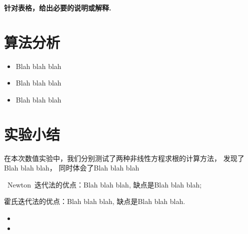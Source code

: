 \documentclass[UTF8]{ctexart}
\begin{document}
{\bf 针对表格，给出必要的说明或解释.}

\section{算法分析}
\begin{itemize}
    \item Blah blah blah  
    \item Blah blah blah  
    \item Blah blah blah  
\end{itemize}


%


\section{实验小结}
在本次数值实验中，我们分别测试了两种非线性方程求根的计算方法，
发现了Blah blah blah，
同时体会了Blah blah blah

~Newton~迭代法的优点：Blah blah blah,
缺点是Blah blah blah;

霍氏迭代法的优点：Blah blah blah, 缺点是Blah blah blah.

\begin{itemize}
    \item 
    \item 
\end{itemize}
\end{document}
